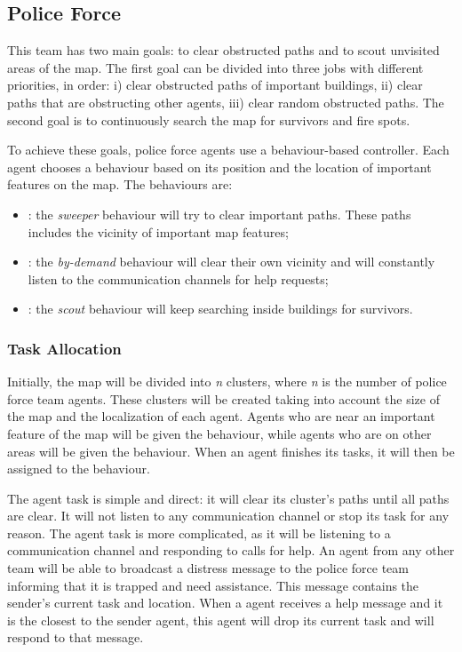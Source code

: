 \subsection{Police Force}
\label{sec:police}
This team has two main goals: to clear obstructed paths and to scout unvisited areas of the map. The first goal can be divided into three jobs with different priorities, in order: i) clear obstructed paths of important buildings, ii) clear paths that are obstructing other agents, iii) clear random obstructed paths. The second goal is to continuously search the map for survivors and fire spots.

To achieve these goals, police force agents use a behaviour-based controller. Each agent chooses a behaviour based on its position and the location of important features on the map. The behaviours are:

\begin{itemize}

  \item {}: the \textit{sweeper} behaviour will try to clear important paths. These paths includes the vicinity of important map features;

  \item {}: the \textit{by-demand} behaviour will clear their own vicinity and will constantly listen to the communication channels for help requests;

  \item {}: the \textit{scout} behaviour will keep searching inside buildings for survivors.

\end{itemize}

\subsubsection{Task Allocation}
Initially, the map will be divided into \emph{n} clusters, where \emph{n} is the number of police force team agents. These clusters will be created taking into account the size of the map and the localization of each agent. Agents who are near an important feature of the map will be given the  behaviour, while agents who are on other areas will be given the  behaviour. When an agent finishes its tasks, it will then be assigned to the  behaviour.

The  agent task is simple and direct: it will clear its cluster's paths until all paths are clear. It will not listen to any communication channel or stop its task for any reason. The  agent task is more complicated, as it will be listening to a communication channel and responding  to calls for help. An agent from any other team will be able to broadcast a distress message to the police force team informing that it is trapped and need assistance. This message contains the sender's current task and location. When a  agent receives a help message and it is the closest to the sender agent, this  agent will drop its current task and will respond to that message.

